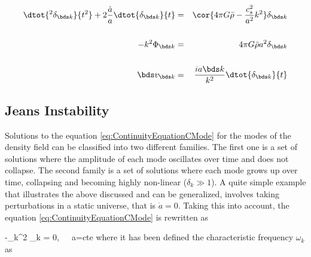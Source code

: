 \begin{eqnarray}
\label{eq:ContinuityEquationCMode}
\dtot{^2 \delta_{\bds k}}{t^2} + 2\frac{\dot a}{a}\dtot{\delta_{\bds k}}{t} &=& 
\cor{ 4\pi G \bar \rho - \frac{c_s^2}{a^2}k^2 }\delta_{\bds k}\\
\nonumber{}
\\
\label{eq:EulerEquationCMode}
- k^2 \Phi_{\bds k} &=& 4\pi G \bar \rho a^2 \delta_{\bds k}\\
\nonumber{}
\\
\label{eq:PoissonEquationCMode}
\bds v_{\bds k} &=& \frac{i a \bds k}{k^2}\dtot{\delta_{\bds k}}{t}
\end{eqnarray}


	\subsection{Jeans Instability}
	\label{subsec:JeansInstability}
	
	
Solutions to the equation \ref{eq:ContinuityEquationCMode} for the modes
of the density field can be classified into two different families. The 
first one is a set of solutions where the amplitude of each mode oscillates
over time and does not collapse. The second family is a set of solutions 
where each mode grows up over time, collapsing and becoming highly 
non-linear ($\delta_k \gg 1$). A quite simple example that illustrates the
above discussed and can be generalized, involves taking perturbations in 
a static universe, that is $\dot a = 0$. Taking this into account, the 
equation \ref{eq:ContinuityEquationCMode} is rewritten as


{ -\omega_k^2 \delta_{\bds k} = 0,\ \ \ a=\mbox{cte}}
where it has been defined the characteristic frequency $\omega_k$ as



